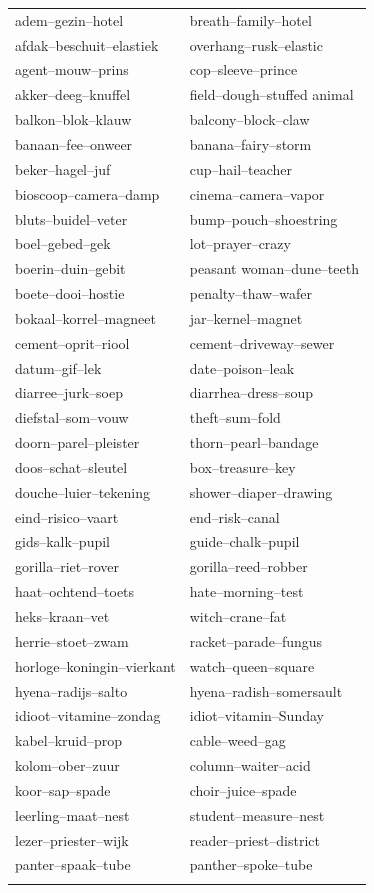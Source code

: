 \documentclass[doc]{apa6}
\begin{document}
\begin{appendix}
\begin{small}
\begin{longtable}{ll}
adem--gezin--hotel  & breath--family--hotel \\
afdak--beschuit--elastiek & overhang--rusk--elastic \\
agent--mouw--prins  & cop--sleeve--prince \\
akker--deeg--knuffel & field--dough--stuffed animal \\
balkon--blok--klauw & balcony--block--claw \\
banaan--fee--onweer & banana--fairy--storm \\
beker--hagel--juf   & cup--hail--teacher \\
bioscoop--camera--damp & cinema--camera--vapor \\
bluts--buidel--veter& bump--pouch--shoestring \\
boel--gebed--gek & lot--prayer--crazy \\
boerin--duin--gebit & peasant woman--dune--teeth \\
boete--dooi--hostie & penalty--thaw--wafer \\
bokaal--korrel--magneet & jar--kernel--magnet \\
cement--oprit--riool & cement--driveway--sewer \\
datum--gif--lek & date--poison--leak \\
diarree--jurk--soep & diarrhea--dress--soup \\
diefstal--som--vouw & theft--sum--fold \\
doorn--parel--pleister & thorn--pearl--bandage \\
doos--schat--sleutel & box--treasure--key \\
douche--luier--tekening & shower--diaper--drawing \\
eind--risico--vaart & end--risk--canal \\
gids--kalk--pupil & guide--chalk--pupil \\
gorilla--riet--rover & gorilla--reed--robber \\
haat--ochtend--toets & hate--morning--test \\
heks--kraan--vet & witch--crane--fat \\
herrie--stoet--zwam & racket--parade--fungus \\
horloge--koningin--vierkant & watch--queen--square \\
hyena--radijs--salto & hyena--radish--somersault \\
idioot--vitamine--zondag & idiot--vitamin--Sunday \\
kabel--kruid--prop & cable--weed--gag \\
kolom--ober--zuur & column--waiter--acid \\
koor--sap--spade & choir--juice--spade \\
leerling--maat--nest & student--measure--nest \\
lezer--priester--wijk & reader--priest--district \\
panter--spaak--tube & panther--spoke--tube \\
\label{table:AppendixRemoteTriadsDomain}
\end{longtable}
\end{small}


\end{appendix}
\end{document}
